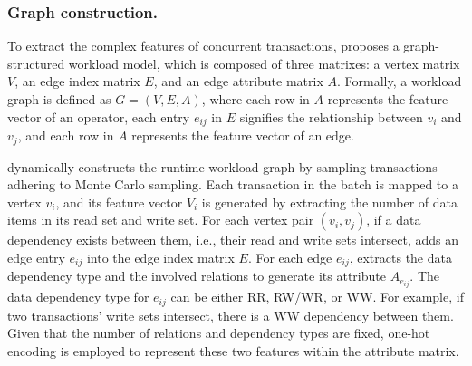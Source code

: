 \subsubsection{Graph construction.} 


To extract the complex features of concurrent transactions, \sysname proposes a graph-structured workload model, which is composed of three matrixes: a vertex matrix $V$, an edge index matrix $E$, and an edge attribute matrix $A$. Formally, a workload graph is defined as $G=(V, E, A)$, where each row in $A$ represents the feature vector of an operator, each entry $e_{ij}$ in $E$ signifies the relationship between $v_i$ and $v_j$, and each row in $A$ represents the feature vector of an edge. 

\sysname dynamically constructs the runtime workload graph by sampling transactions adhering to Monte Carlo sampling. Each transaction in the batch is mapped to a vertex $v_i$, and its feature vector $V_i$ is generated by extracting the number of data items in its read set and write set.
For each vertex pair $(v_i, v_j)$, if a data dependency exists between them, i.e., their read and write sets intersect, \sysname adds an edge entry $e_{ij}$ into the edge index matrix $E$. For each edge $e_{ij}$, \sysname extracts the data dependency type and the involved relations to generate its attribute $A_{e_{ij}}$. The data dependency type for $e_{ij}$ can be either RR, RW/WR, or WW. For example, if two transactions' write sets intersect, there is a WW dependency between them. Given that the number of relations and dependency types are fixed, one-hot encoding is employed to represent these two features within the attribute matrix.




